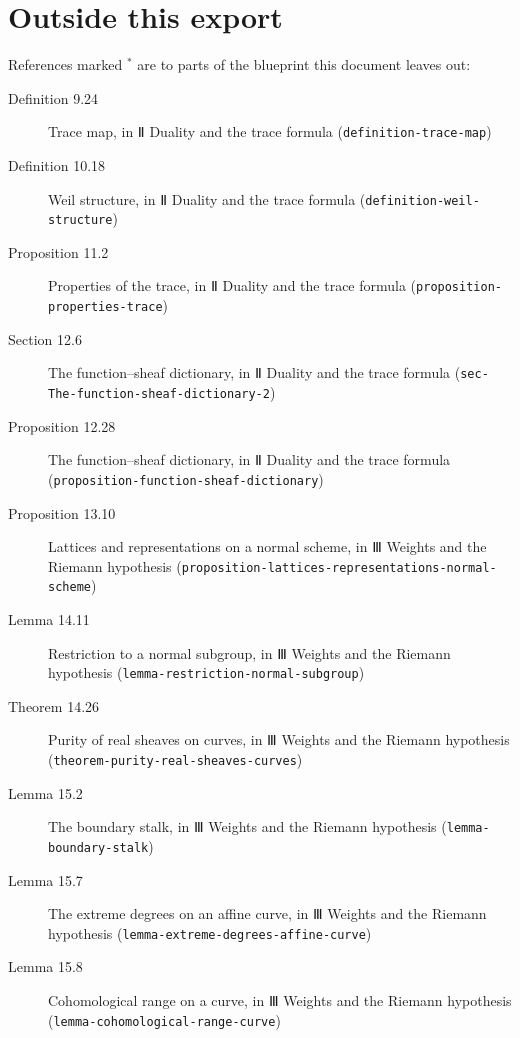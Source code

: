 \documentclass[11pt]{article}
\newcommand{\bpslug}[1]{\texttt{#1}}
\begin{document}
\section*{Outside this export}
References marked \ensuremath{{}^\ast} are to parts of the blueprint this document leaves out:
\begin{description}
\item[Definition 9.24] Trace map, in Ⅱ Duality and the trace formula (\bpslug{definition-{}\allowbreak{}trace-{}\allowbreak{}map})
\item[Definition 10.18] Weil structure, in Ⅱ Duality and the trace formula (\bpslug{definition-{}\allowbreak{}weil-{}\allowbreak{}structure})
\item[Proposition 11.2] Properties of the trace, in Ⅱ Duality and the trace formula (\bpslug{proposition-{}\allowbreak{}properties-{}\allowbreak{}trace})
\item[Section 12.6] The function–sheaf dictionary, in Ⅱ Duality and the trace formula (\bpslug{sec-{}\allowbreak{}The-{}\allowbreak{}function-{}\allowbreak{}sheaf-{}\allowbreak{}dictionary-{}\allowbreak{}2})
\item[Proposition 12.28] The function–sheaf dictionary, in Ⅱ Duality and the trace formula (\bpslug{proposition-{}\allowbreak{}function-{}\allowbreak{}sheaf-{}\allowbreak{}dictionary})
\item[Proposition 13.10] Lattices and representations on a normal scheme, in Ⅲ Weights and the Riemann hypothesis (\bpslug{proposition-{}\allowbreak{}lattices-{}\allowbreak{}representations-{}\allowbreak{}normal-{}\allowbreak{}scheme})
\item[Lemma 14.11] Restriction to a normal subgroup, in Ⅲ Weights and the Riemann hypothesis (\bpslug{lemma-{}\allowbreak{}restriction-{}\allowbreak{}normal-{}\allowbreak{}subgroup})
\item[Theorem 14.26] Purity of real sheaves on curves, in Ⅲ Weights and the Riemann hypothesis (\bpslug{theorem-{}\allowbreak{}purity-{}\allowbreak{}real-{}\allowbreak{}sheaves-{}\allowbreak{}curves})
\item[Lemma 15.2] The boundary stalk, in Ⅲ Weights and the Riemann hypothesis (\bpslug{lemma-{}\allowbreak{}boundary-{}\allowbreak{}stalk})
\item[Lemma 15.7] The extreme degrees on an affine curve, in Ⅲ Weights and the Riemann hypothesis (\bpslug{lemma-{}\allowbreak{}extreme-{}\allowbreak{}degrees-{}\allowbreak{}affine-{}\allowbreak{}curve})
\item[Lemma 15.8] Cohomological range on a curve, in Ⅲ Weights and the Riemann hypothesis (\bpslug{lemma-{}\allowbreak{}cohomological-{}\allowbreak{}range-{}\allowbreak{}curve})

\end{description}
\end{document}
